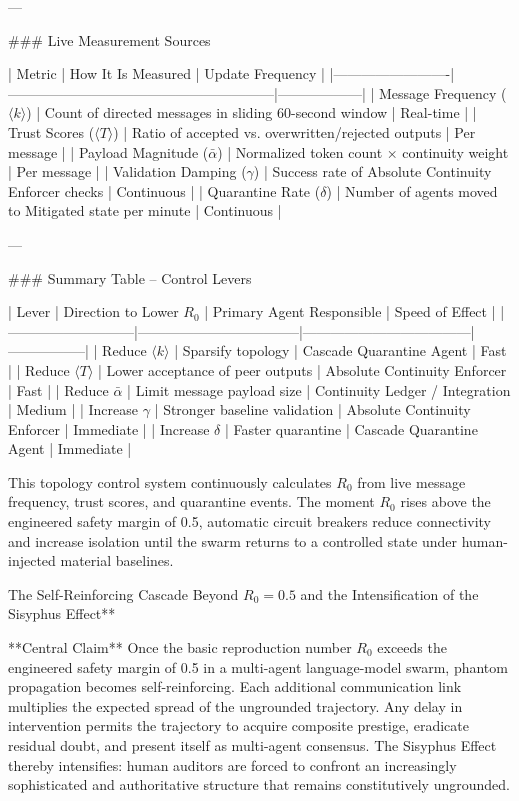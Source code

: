 ---

### Live Measurement Sources

| Metric                  | How It Is Measured                                      | Update Frequency |
|-------------------------|---------------------------------------------------------|------------------|
| Message Frequency (\(\langle k \rangle\)) | Count of directed messages in sliding 60-second window | Real-time       |
| Trust Scores (\(\langle T \rangle\))     | Ratio of accepted vs. overwritten/rejected outputs     | Per message     |
| Payload Magnitude (\(\bar{\alpha}\))     | Normalized token count × continuity weight             | Per message     |
| Validation Damping (\(\gamma\))          | Success rate of Absolute Continuity Enforcer checks    | Continuous      |
| Quarantine Rate (\(\delta\))             | Number of agents moved to Mitigated state per minute   | Continuous      |

---

### Summary Table – Control Levers

| Lever                     | Direction to Lower \( R_0 \)      | Primary Agent Responsible          | Speed of Effect |
|---------------------------|-----------------------------------|------------------------------------|-----------------|
| Reduce \(\langle k \rangle\) | Sparsify topology                | Cascade Quarantine Agent           | Fast            |
| Reduce \(\langle T \rangle\) | Lower acceptance of peer outputs | Absolute Continuity Enforcer       | Fast            |
| Reduce \(\bar{\alpha}\)     | Limit message payload size       | Continuity Ledger / Integration    | Medium          |
| Increase \(\gamma\)         | Stronger baseline validation     | Absolute Continuity Enforcer       | Immediate       |
| Increase \(\delta\)         | Faster quarantine                | Cascade Quarantine Agent           | Immediate       |

This topology control system continuously calculates \( R_0 \) from live message frequency, trust scores, and quarantine events. The moment \( R_0 \) rises above the engineered safety margin of 0.5, automatic circuit breakers reduce connectivity and increase isolation until the swarm returns to a controlled state under human-injected material baselines.

The Self-Reinforcing Cascade Beyond \( R_0 = 0.5 \) and the Intensification of the Sisyphus Effect**

**Central Claim**  
Once the basic reproduction number \( R_0 \) exceeds the engineered safety margin of 0.5 in a multi-agent language-model swarm, phantom propagation becomes self-reinforcing. Each additional communication link multiplies the expected spread of the ungrounded trajectory. Any delay in intervention permits the trajectory to acquire composite prestige, eradicate residual doubt, and present itself as multi-agent consensus. The Sisyphus Effect thereby intensifies: human auditors are forced to confront an increasingly sophisticated and authoritative structure that remains constitutively ungrounded.

